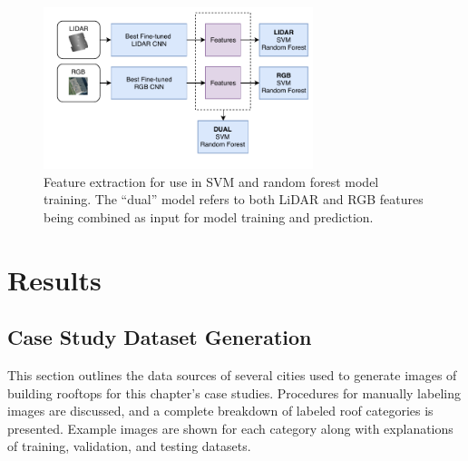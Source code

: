 \begin{figure}[H]
\centering
\includegraphics[width=0.7\textwidth]{chapter_4_roofshape/imgs/CNN_Extraction.pdf}
\vspace{-9PT}

\caption[Feature extraction for use in SVM and random forest model training]{Feature extraction for use in SVM and random forest model training. The ``dual'' model refers to both LiDAR and RGB features being combined as input for model training and prediction. }
\label{fig:dual_classical}
\end{figure}







\section{Results}
\unskip
\subsection{Case Study Dataset Generation}

This section outlines the data sources of several cities used to generate images of building rooftops for this chapter's case studies. Procedures for manually labeling images are  discussed, and a complete breakdown of labeled roof categories is presented. Example images are shown for each category along with explanations of training, validation, and testing datasets.


